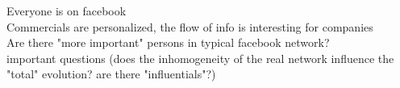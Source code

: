 Everyone is on facebook\\
Commercials are personalized, the flow of info is interesting for companies\\
Are there "more important" persons in typical facebook network?\\

important questions (does the inhomogeneity of the real network influence the "total" evolution? are there  "influentials"?)